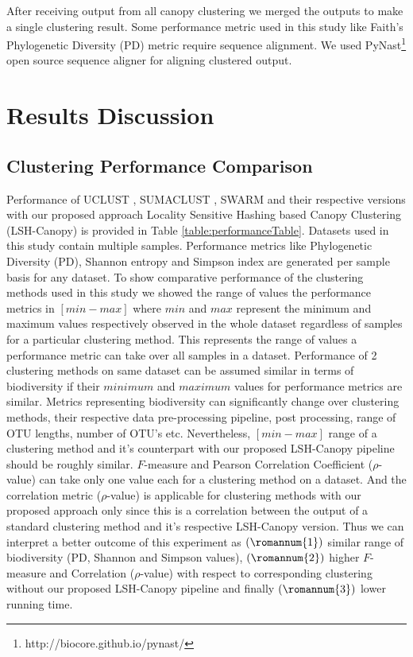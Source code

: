 \documentclass[10pt, conference, compsocconf]{IEEEtran}
\begin{document}
After receiving output from all canopy clustering we merged the outputs to make a single clustering result. Some performance metric used in this study like Faith’s Phylogenetic Diversity (PD) metric require sequence alignment. We used PyNast\footnote{http://biocore.github.io/pynast/} \cite{MARPynast} open source sequence aligner for aligning clustered output.    


\section{Results Discussion} 
\label{sec:results}

\subsection{\textbf{Clustering Performance Comparison}}

Performance of UCLUST \cite{MARuclust}, SUMACLUST \cite{MARSumaclust}, SWARM \cite{MARSwarm} and their respective versions with our proposed approach Locality Sensitive Hashing based Canopy Clustering (LSH-Canopy) is provided in Table \ref{table:performanceTable}. Datasets used in this study contain multiple samples. Performance metrics like Phylogenetic Diversity (PD), Shannon entropy and Simpson index are generated per sample basis for any dataset. To show comparative performance of the clustering methods used in this study we showed the range of values the performance metrics in $\left[min-max\right]$ where $min$ and $max$ represent the minimum and maximum values respectively observed in the whole dataset regardless of samples for a particular clustering method. This represents the range of values a performance metric can take over all samples in a dataset. Performance of 2 clustering methods on same dataset can be assumed similar in terms of biodiversity if their $minimum$ and $maximum$ values for performance metrics are similar. Metrics representing biodiversity can significantly change over clustering methods, their respective data pre-processing pipeline, post processing, range of OTU lengths, number of OTU's etc. Nevertheless, $\left[min-max\right]$ range of a clustering method and it's counterpart with our proposed LSH-Canopy pipeline should be roughly similar. $F$-measure and Pearson Correlation Coefficient ($\rho$-value) can take only one value each for a clustering method on a dataset. And the correlation metric ($\rho$-value) is applicable for clustering methods with our proposed approach only since this is a correlation between the output of a standard clustering method and it's respective LSH-Canopy version. Thus we can interpret a better outcome of this experiment as $(\romannum{1})$  similar range of biodiversity (PD, Shannon and Simpson values), $(\romannum{2})$ higher $F$-measure and Correlation ($\rho$-value) with respect to corresponding clustering without our proposed LSH-Canopy pipeline and finally $(\romannum{3})$ lower running time. 
\end{document}
